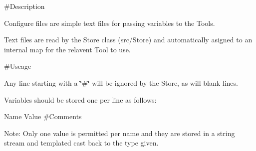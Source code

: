  \#\+Description 


Configure files are simple text files for passing variables to the Tools.

Text files are read by the Store class (src/\+Store) and automatically asigned to an internal map for the relavent Tool to use.

 \#\+Useage 


Any line starting with a \char`\"{}\#\char`\"{} will be ignored by the Store, as will blank lines.

Variables should be stored one per line as follows\+:

Name Value \#\+Comments

Note\+: Only one value is permitted per name and they are stored in a string stream and templated cast back to the type given. 